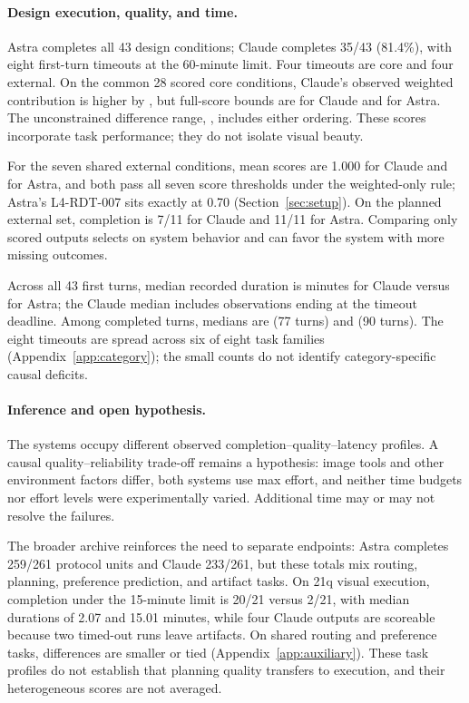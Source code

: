\paragraph{Design execution, quality, and time.}
Astra completes all 43 design conditions; Claude completes 35/43 (81.4\%), with eight first-turn timeouts at the 60-minute limit. Four timeouts are core and four external. On the common 28 scored core conditions, Claude's observed weighted contribution is higher by \PairedCoreDelta{}, but full-score bounds are \PairedClaudeCore{} for Claude and \PairedAstraCore{} for Astra. The unconstrained difference range, \PairedCoreDifference{}, includes either ordering. These scores incorporate task performance; they do not isolate visual beauty.

For the seven shared external conditions, mean scores are 1.000 for Claude and \PairedAstraExternal{} for Astra, and both pass all seven score thresholds under the weighted-only rule; Astra's L4-RDT-007 sits exactly at 0.70 (Section~\ref{sec:setup}). On the planned external set, completion is 7/11 for Claude and 11/11 for Astra. Comparing only scored outputs selects on system behavior and can favor the system with more missing outcomes.

Across all 43 first turns, median recorded duration is \ClaudeFirstTurnMinutes{} minutes for Claude versus \AstraFirstTurnMinutes{} for Astra; the Claude median includes observations ending at the timeout deadline. Among completed turns, medians are \ClaudeCompletedTurnMinutes{} (77 turns) and \AstraCompletedTurnMinutes{} (90 turns). The eight timeouts are spread across six of eight task families (Appendix~\ref{app:category}); the small counts do not identify category-specific causal deficits.

\paragraph{Inference and open hypothesis.}
The systems occupy different observed completion--quality--latency profiles. A causal quality--reliability trade-off remains a hypothesis: image tools and other environment factors differ, both systems use max effort, and neither time budgets nor effort levels were experimentally varied. Additional time may or may not resolve the failures.

The broader archive reinforces the need to separate endpoints: Astra completes 259/261 protocol units and Claude 233/261, but these totals mix routing, planning, preference prediction, and artifact tasks. On 21q visual execution, completion under the 15-minute limit is 20/21 versus 2/21, with median durations of 2.07 and 15.01 minutes, while four Claude outputs are scoreable because two timed-out runs leave artifacts. On shared routing and preference tasks, differences are smaller or tied (Appendix~\ref{app:auxiliary}). These task profiles do not establish that planning quality transfers to execution, and their heterogeneous scores are not averaged.

